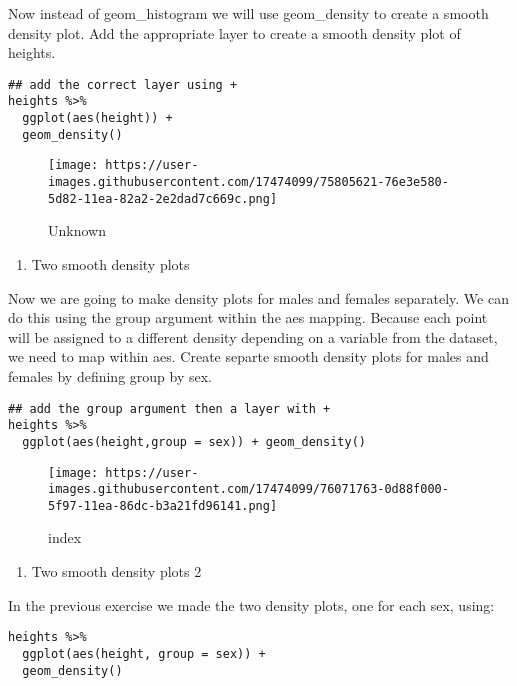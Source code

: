 \documentclass[]{article}
\providecommand{\tightlist}{%
  \setlength{\itemsep}{0pt}\setlength{\parskip}{0pt}}
\begin{document}
Now instead of geom\_histogram we will use geom\_density to create a
smooth density plot. Add the appropriate layer to create a smooth
density plot of heights.

\begin{verbatim}
## add the correct layer using +
heights %>% 
  ggplot(aes(height)) +
  geom_density()
\end{verbatim}

\begin{figure}
\centering
\texttt{[image: https://user-images.githubusercontent.com/17474099/75805621-76e3e580-5d82-11ea-82a2-2e2dad7c669c.png]}
\caption{Unknown}
\end{figure}

\begin{enumerate}
\def\labelenumi{\arabic{enumi}.}
\setcounter{enumi}{19}
\tightlist
\item
  Two smooth density plots
\end{enumerate}

Now we are going to make density plots for males and females separately.
We can do this using the group argument within the aes mapping. Because
each point will be assigned to a different density depending on a
variable from the dataset, we need to map within aes. Create separte
smooth density plots for males and females by defining group by sex.

\begin{verbatim}
## add the group argument then a layer with +
heights %>% 
  ggplot(aes(height,group = sex)) + geom_density()
\end{verbatim}

\begin{figure}
\centering
\texttt{[image: https://user-images.githubusercontent.com/17474099/76071763-0d88f000-5f97-11ea-86dc-b3a21fd96141.png]}
\caption{index}
\end{figure}

\begin{enumerate}
\def\labelenumi{\arabic{enumi}.}
\setcounter{enumi}{20}
\tightlist
\item
  Two smooth density plots 2
\end{enumerate}

In the previous exercise we made the two density plots, one for each
sex, using:

\begin{verbatim}
heights %>% 
  ggplot(aes(height, group = sex)) + 
  geom_density()
\end{verbatim}
\end{document}
